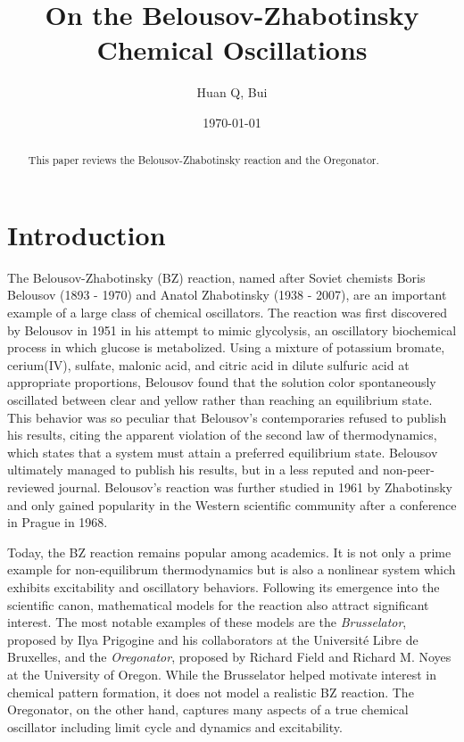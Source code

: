 \documentclass[twocolumn,amsmath,amssymb,aps]{revtex4}
\begin{document}
\title{On the Belousov-Zhabotinsky Chemical Oscillations}%
\author{Huan Q, Bui}
\date{\today}
\begin{abstract}
This paper reviews the Belousov-Zhabotinsky reaction and the Oregonator. 
\end{abstract}
\maketitle




\section{\label{sec:level1}Introduction}
The Belousov-Zhabotinsky (BZ) reaction, named after Soviet chemists Boris Belousov (1893 - 1970) and Anatol Zhabotinsky (1938 - 2007), are an important example of a large class of chemical oscillators. The reaction was first discovered by Belousov in 1951 in his attempt to mimic glycolysis, an oscillatory biochemical process in which glucose is metabolized. Using a mixture of potassium bromate, cerium(IV), sulfate, malonic acid, and citric acid in dilute sulfuric acid at appropriate proportions, Belousov found that the solution color spontaneously oscillated between clear and yellow rather than reaching an equilibrium state. This behavior was so peculiar that Belousov's contemporaries refused to publish his results, citing the apparent violation of the second law of thermodynamics, which states that a system must attain a preferred equilibrium state. Belousov ultimately managed to publish his results, but in a less reputed and non-peer-reviewed journal. Belousov's reaction was further studied in 1961 by Zhabotinsky and only gained popularity in the Western scientific community after a conference in Prague in 1968.

Today, the BZ reaction remains popular among academics. It is not only a prime example for non-equilibrum thermodynamics but is also a nonlinear system which exhibits excitability and oscillatory behaviors. Following its emergence into the scientific canon, mathematical models for the reaction also attract significant interest. The most notable examples of these models are the \textit{Brusselator}, proposed by Ilya Prigogine and his collaborators at the Université Libre de Bruxelles, and the \textit{Oregonator}, proposed by Richard Field and Richard M. Noyes at the University of Oregon. While the Brusselator helped motivate interest in chemical pattern formation, it does not model a realistic BZ reaction. The Oregonator, on the other hand, captures many aspects of a true chemical oscillator including limit cycle and dynamics and excitability.
\end{document}
